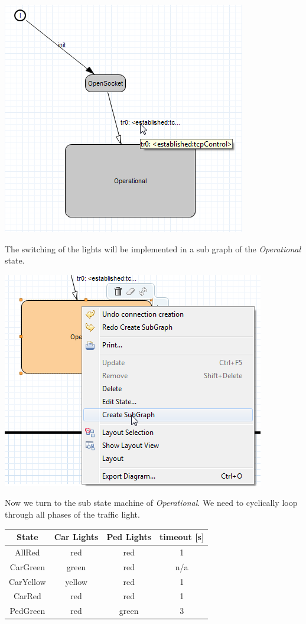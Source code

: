 \includegraphics{images/018-trans-to-operational.png}

The switching of the lights will be implemented in a sub graph of the \textit{Operational} state.

\includegraphics{images/018-create-sub-graph.png}

Now we turn to the sub state machine of \textit{Operational}. We need to cyclically loop through all
phases of the traffic light.

\begin{tabular}{|c|c|c|c|}
\hline 
State & Car Lights & Ped Lights & timeout [s]\\ 
\hline 
AllRed & red & red & 1 \\ 
\hline 
CarGreen & green & red & n/a \\ 
\hline 
CarYellow & yellow & red & 1 \\ 
\hline 
CarRed & red & red & 1 \\ 
\hline 
PedGreen & red & green & 3 \\ 
\hline 
\end{tabular}

